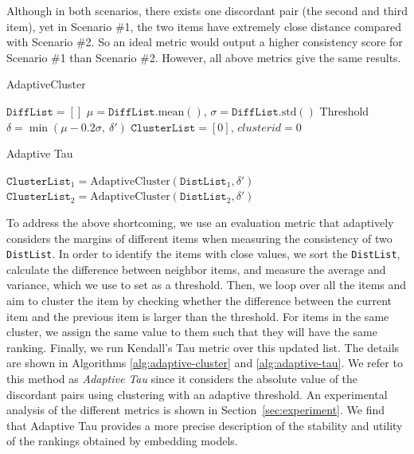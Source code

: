 Although in both scenarios, there exists one discordant pair (the second and third item), yet in Scenario \#1, the two items have extremely close distance compared with Scenario \#2. So an ideal metric would output a higher consistency score for Scenario \#1 than Scenario \#2. However, all above metrics give the same results.


\begin{algorithm}[t]
\small
\caption{AdaptiveCluster}
\label{alg:adaptive-cluster}
\BlankLine
$\texttt{DiffList} = []$\;
$\mu=\texttt{DiffList}.\text{mean}()$, $\sigma=\texttt{DiffList}.\text{std}()$\;
Threshold $\delta=\min(\mu-0.2\sigma,\: \delta')$\;
$\texttt{ClusterList}=[0]$, $clusterid=0$\;
\;
\end{algorithm}

\begin{algorithm}[t]
\small
\caption{Adaptive Tau}
\label{alg:adaptive-tau}
\BlankLine
$\texttt{ClusterList}_1=\text{AdaptiveCluster}(\texttt{DistList}_1, \delta')$\;
$\texttt{ClusterList}_2=\text{AdaptiveCluster}(\texttt{DistList}_2, \delta')$\;
\;
\end{algorithm}

To address the above shortcoming, we use an evaluation metric that adaptively considers the margins of different items when measuring the consistency of two \texttt{DistList}. In order to identify the items with close values, we sort the \texttt{DistList}, calculate the difference between neighbor items, and measure the average and variance, which we use to set as a threshold. Then, we loop over all the items and aim to cluster the item by checking whether the difference between the current item and the previous item is larger than the threshold. 
For items in the same cluster, we assign the same value to them such that they will have the same ranking. Finally, we run Kendall's Tau metric over this updated list. The details are shown in Algorithms \ref{alg:adaptive-cluster} and \ref{alg:adaptive-tau}.
We refer to this method as \emph{Adaptive Tau} since it considers the absolute value of the discordant pairs using clustering with an adaptive threshold. An experimental analysis of the different metrics is shown in Section~\ref{sec:experiment}. We find that Adaptive Tau provides a more precise description of the stability and utility of the rankings obtained by embedding models.

